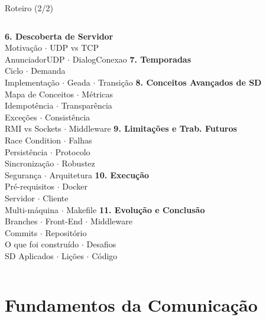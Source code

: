 \documentclass[aspectratio=169]{beamer}
\begin{document}
\begin{frame}{Roteiro (2/2)}
  \footnotesize
  \begin{columns}
    \textbf{6. Descoberta de Servidor} \\
    \quad Motiva\c{c}\~ao $\cdot$ UDP vs TCP \\
    \quad AnunciadorUDP $\cdot$ DialogConexao
    \vfill
    \textbf{7. Temporadas} \\
    \quad Ciclo $\cdot$ Demanda \\
    \quad Implementa\c{c}\~ao $\cdot$ Geada $\cdot$ Transi\c{c}\~ao
    \vfill
    \textbf{8. Conceitos Avan\c{c}ados de SD} \\
    \quad Mapa de Conceitos $\cdot$ M\'etricas \\
    \quad Idempot\^encia $\cdot$ Transpar\^encia \\
    \quad Exce\c{c}\~oes $\cdot$ Consist\^encia \\
    \quad RMI vs Sockets $\cdot$ Middleware
    \vfill
    \textbf{9. Limita\c{c}\~oes e Trab. Futuros} \\
    \quad Race Condition $\cdot$ Falhas \\
    \quad Persist\^encia $\cdot$ Protocolo \\
    \quad Sincroniza\c{c}\~ao $\cdot$ Robustez \\
    \quad Seguran\c{c}a $\cdot$ Arquitetura
    \textbf{10. Execu\c{c}\~ao} \\
    \quad Pr\'e-requisitos $\cdot$ Docker \\
    \quad Servidor $\cdot$ Cliente \\
    \quad Multi-m\'aquina $\cdot$ Makefile
    \vfill
    \textbf{11. Evolu\c{c}\~ao e Conclus\~ao} \\
    \quad Branches $\cdot$ Front-End $\cdot$ Middleware \\
    \quad Commits $\cdot$ Reposit\'orio \\
    \quad O que foi constru\'ido $\cdot$ Desafios \\
    \quad SD Aplicados $\cdot$ Li\c{c}\~oes $\cdot$ C\'odigo
  \end{columns}
\end{frame}

\section{Fundamentos da Comunica\c{c}\~ao}
\end{document}
